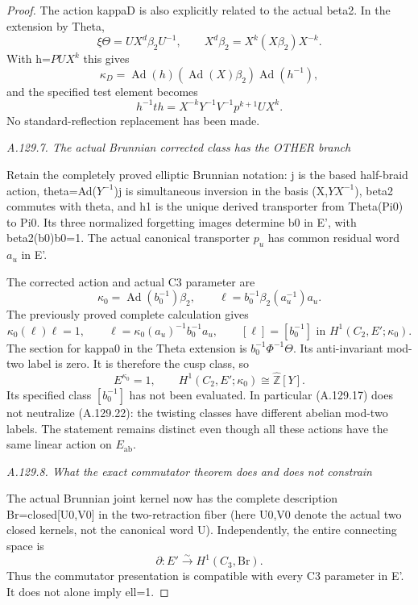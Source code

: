 \begin{proof}
The action kappaD is also explicitly related to the actual beta2. In the extension by Theta,
\[
 \xi\Theta=U X^d\beta_2 U^{-1},\qquad
 X^d\beta_2=X^k(X\beta_2)X^{-k}.
\]
With h=\(PUX^k\) this gives
\[
 \kappa_D=\operatorname{Ad}(h)
              (\operatorname{Ad}(X)\beta_2)
              \operatorname{Ad}(h^{-1}),
\]
and the specified test element becomes
\[
 h^{-1}th=X^{-k}Y^{-1}V^{-1}p^{k+1}UX^k.
\tag{A.129.20}
\]
No standard-reflection replacement has been made.

\par\smallskip\noindent\emph{A.129.7. The actual Brunnian corrected class has the OTHER branch}

Retain the completely proved elliptic Brunnian notation: j is the based half-braid action, theta=Ad(\(Y^{-1}\))j is simultaneous inversion in the basis (X,\(YX^{-1}\)), beta2 commutes with theta, and h1 is the unique derived transporter from Theta(Pi0) to Pi0. Its three normalized forgetting images determine b0 in E', with beta2(b0)b0=1. The actual canonical transporter \(p_u\) has common residual word \(a_u\) in E'.

The corrected action and actual C3 parameter are
\[
 \kappa_0=\operatorname{Ad}(b_0^{-1})\beta_2,
 \qquad\ell=b_0^{-1}\beta_2(a_u^{-1})a_u.
\tag{A.129.21}
\]
The previously proved complete calculation gives
\[
 \kappa_0(\ell)\ell=1,\qquad
 \ell=\kappa_0(a_u)^{-1}b_0^{-1}a_u,
 \qquad[\ell]=[b_0^{-1}]
 \text{ in }H^1(C_2,E';\kappa_0).
\tag{A.129.22}
\]
The section for kappa0 in the Theta extension is \(b_0^{-1}\Phi^{-1}\Theta\). Its anti-invariant mod-two label is zero. It is therefore the cusp class, so
\[
 E^{\kappa_0}=1,\qquad
 H^1(C_2,E';\kappa_0)\cong\widehat{\mathbb Z}[Y].
\tag{A.129.23}
\]
Its specified class \([b_0^{-1}]\) has not been evaluated. In particular (A.129.17) does not neutralize (A.129.22): the twisting classes have different abelian mod-two labels. The statement remains distinct even though all these actions have the same linear action on \(E_{\mathrm{ab}}\).

\par\smallskip\noindent\emph{A.129.8. What the exact commutator theorem does and does not constrain}

The actual Brunnian joint kernel now has the complete description Br=closed[U0,V0] in the two-retraction fiber (here U0,V0 denote the actual two closed kernels, not the canonical word U). Independently, the entire connecting space is
\[
 \partial:E'\xrightarrow{\sim}H^1(C_3,\mathrm{Br}).
\]
Thus the commutator presentation is compatible with every C3 parameter in E'. It does not alone imply ell=1.


\end{proof}
